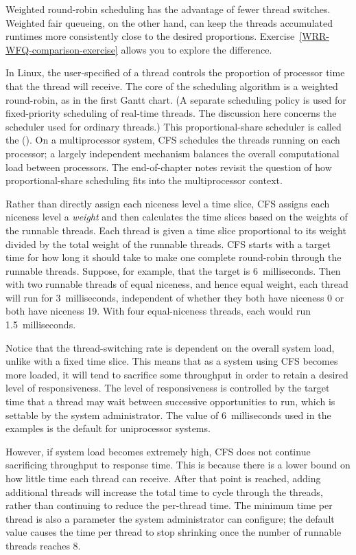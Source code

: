 Weighted round-robin scheduling has the advantage of fewer thread switches.  Weighted fair queueing, on the other hand, can keep the threads accumulated runtimes more consistently close to the desired proportions.  Exercise~\ref{WRR-WFQ-comparison-exercise} allows you to explore the difference.

In
Linux, the user-specified  of a thread controls the
proportion of processor time that the thread will receive.
The core of the scheduling algorithm is a weighted round-robin, as in the first
Gantt chart.
(A separate scheduling policy is used for
fixed-priority scheduling
of real-time threads.  The discussion
here concerns the scheduler  used for
ordinary threads.)
This proportional-share scheduler is called the  ().
On a multiprocessor system, CFS schedules the threads running on each processor; a largely independent
mechanism balances the overall computational load between processors.  The end-of-chapter notes
revisit the question of how proportional-share scheduling fits into the multiprocessor context.

Rather than directly assign each niceness level a time slice, CFS assigns
each niceness level a \textit{weight} and then calculates the time slices
based on the weights of the runnable threads.  Each thread is given a
time slice proportional to its weight divided by the total weight of
the runnable threads.  CFS starts with a target time for how long it
should take to make one complete round-robin through the runnable
threads.  Suppose, for example, that the target is 6~milliseconds.  Then with
two runnable threads of equal niceness, and hence equal weight, each
thread will run for 3~milliseconds, independent of whether they both have
niceness 0 or both have niceness 19.  With four equal-niceness
threads, each would run 1.5~milliseconds.

Notice that the thread-switching rate is dependent on the overall
system load, unlike with a fixed time slice.  This means that as a
system using CFS becomes more loaded, it will tend to sacrifice some
throughput in order to retain a desired level of responsiveness.  The
level of responsiveness is controlled by the target time that a thread
may wait between successive opportunities to run, which  is settable by the system
administrator.  The value of 6~milliseconds used in the examples is the
default for uniprocessor systems.

However, if system load becomes extremely high, CFS does not
continue sacrificing throughput to response time.  This is because
there is a lower bound on how little time each thread can receive.
After that point is reached, adding additional threads will increase
the total time to cycle through the threads, rather than continuing to
reduce the per-thread time.  The minimum time per thread is also a
parameter the system administrator can configure; the default value
causes the time per thread to stop shrinking once the number of runnable threads reaches 8.


